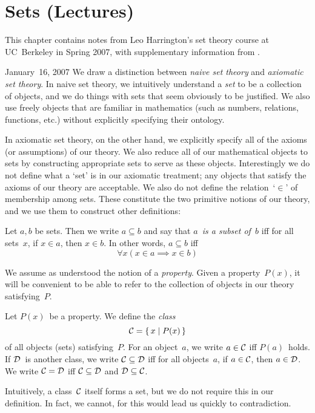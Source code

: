 %
%
%
\chapter{Sets (Lectures)}
This chapter contains notes from Leo Harrington's set theory course at UC~Berkeley in Spring 2007, with supplementary information from \cite{enderton77}.

\begin{lecture}{January~16, 2007}
We draw a distinction between \emph{naive set theory} and \emph{axiomatic set theory}. In naive set theory, we intuitively understand a \emph{set} to be a collection of objects, and we do things with sets that seem obviously to be justified. We also use freely objects that are familiar in mathematics (such as numbers, relations, functions, etc.) without explicitly specifying their ontology.

In axiomatic set theory, on the other hand, we explicitly specify all of the axioms (or assumptions) of our theory. We also reduce all of our mathematical objects to sets by constructing appropriate sets to serve as these objects. Interestingly we do not define what a `set' is in our axiomatic treatment; any objects that satisfy the axioms of our theory are acceptable. We also do not define the relation~`\(\in\)' of membership among sets. These constitute the two primitive notions of our theory, and we use them to construct other definitions:
\begin{defn}
Let \(a,b\) be sets. Then we write \(a\subseteq b\) and say that \emph{\(a\)~is a subset of~\(b\)} iff for all sets~\(x\), if \(x\in a\), then \(x\in b\). In other words, \(a\subseteq b\) iff
\[\forall x(x\in a\implies x\in b)\]
\end{defn}

We assume as understood the notion of a \emph{property}. Given a property~\(P(x)\), it will be convenient to be able to refer to the collection of objects in our theory satisfying~\(P\).
\begin{defn}
Let \(P(x)\)~be a property. We define the \emph{class}
\[\mathcal{C}=\{\,x\mid P(x)\,\}\]
of all objects (sets) satisfying~\(P\). For an object~\(a\), we write \(a\in\mathcal{C}\) iff \(P(a)\)~holds. If \(\mathcal{D}\)~is another class, we write \(\mathcal{C}\subseteq\mathcal{D}\) iff for all objects~\(a\), if \(a\in\mathcal{C}\), then \(a\in\mathcal{D}\). We write \(\mathcal{C}=\mathcal{D}\) iff \(\mathcal{C}\subseteq\mathcal{D}\) and \(\mathcal{D}\subseteq\mathcal{C}\).
\end{defn}
Intuitively, a class~\(\mathcal{C}\) itself forms a set, but we do not require this in our definition. In fact, we cannot, for this would lead us quickly to contradiction.


\end{lecture}
